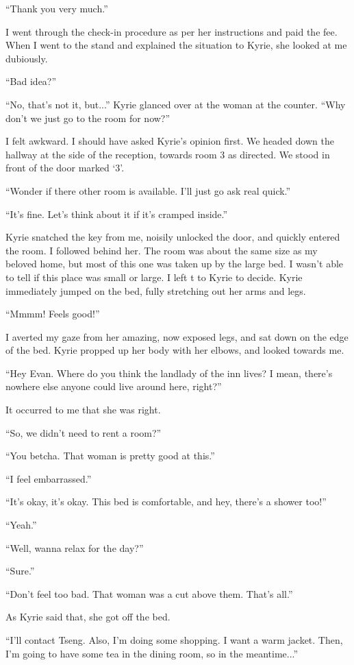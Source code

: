\documentclass[oneside]{book}
\begin{document}
“Thank you very much.”

I went through the check-in procedure as per her instructions and paid the fee. When I went to the stand and explained the situation to Kyrie, she looked at me dubiously.

“Bad idea?”

“No, that’s not it, but...” Kyrie glanced over at the woman at the counter. “Why don’t we just go to the room for now?”

I felt awkward. I should have asked Kyrie’s opinion first. We headed down the hallway at the side of the reception, towards room 3 as directed. We stood in front of the door marked ‘3’.

“Wonder if there other room is available. I’ll just go ask real quick.”

“It’s fine. Let’s think about it if it’s cramped inside.”

Kyrie snatched the key from me, noisily unlocked the door, and quickly entered the room. I followed behind her. The room was about the same size as my beloved home, but most of this one was taken up by the large bed. I wasn’t able to tell if this place was small or large. I left t to Kyrie to decide. Kyrie immediately jumped on the bed, fully stretching out her arms and legs.

“Mmmm! Feels good!”

I averted my gaze from her amazing, now exposed legs, and sat down on the edge of the bed. Kyrie propped up her body with her elbows, and looked towards me.

“Hey Evan. Where do you think the landlady of the inn lives? I mean, there’s nowhere else anyone could live around here, right?”

It occurred to me that she was right.

“So, we didn’t need to rent a room?”

“You betcha. That woman is pretty good at this.”

“I feel embarrassed.”

“It’s okay, it’s okay. This bed is comfortable, and hey, there’s a shower too!”

“Yeah.”

“Well, wanna relax for the day?”

“Sure.”

“Don’t feel too bad. That woman was a cut above them. That’s all.”

As Kyrie said that, she got off the bed.

“I’ll contact Tseng. Also, I’m doing some shopping. I want a warm jacket. Then, I’m going to have some tea in the dining room, so in the meantime...”
\end{document}
